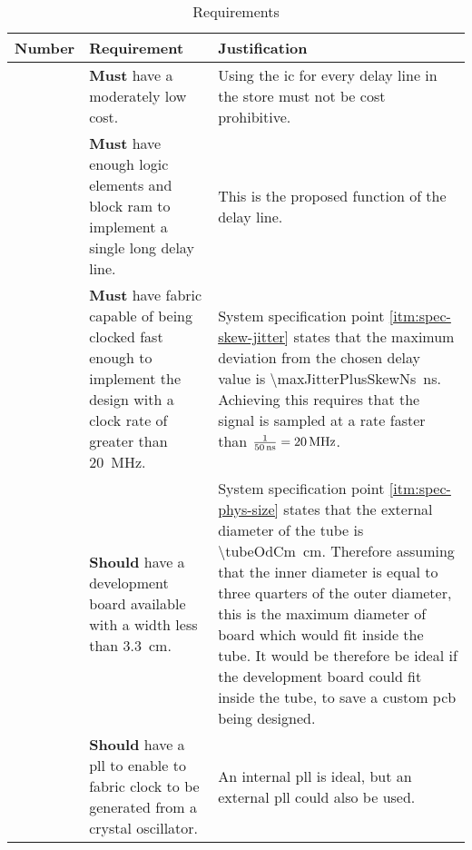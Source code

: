 \newcommand{\minFpgaClkMhz}{20}
\begin{table}[ht]
	\centering
	
	\caption{ Requirements}

	\label{tbl:fpga-reqs}
	\begin{tabular}{l p{} p{}}

		\toprule

		Number & Requirement & Justification \\

		
		\midrule

		{FpgaSpecNo}\theFpgaSpecNo\label{itm:fpga-spec-cost} &
		\textbf{Must} have a moderately low cost. &
		Using the \gls{ic} for every delay line in the store must not be cost prohibitive.\\
		
		
		\midrule
		
		{FpgaSpecNo}\theFpgaSpecNo\label{itm:fpga-spec-les} &
		\textbf{Must} have enough logic elements and block \gls{ram} to implement a single long delay line. &
		This is the proposed function of the delay line.\\
		
		\midrule

		{FpgaSpecNo}\theFpgaSpecNo\label{itm:fpga-spec-speed} &
		\textbf{Must} have fabric capable of being clocked fast enough to implement the design with a clock rate of greater than \SI{\minFpgaClkMhz}{\mega\hertz}. &
		System specification point \ref{itm:spec-skew-jitter} states that the maximum deviation from the chosen delay value is \SI{\maxJitterPlusSkewNs}{\nano\second}. Achieving this requires that the signal is sampled at a rate faster than $\frac{1}{\SI{\maxJitterPlusSkewNs}{\nano\second}}=\SI{\minFpgaClkMhz}{\mega\hertz}$.\\
		
		\midrule

		{FpgaSpecNo}\theFpgaSpecNo\label{itm:fpga-spec-dev-board} &
		\textbf{Should} have a development board available with a width less than \SI{3.3}{\centi\metre}. &
		System specification point \ref{itm:spec-phys-size} states that the external diameter of the tube is \SI{\tubeOdCm}{\centi\metre}. Therefore assuming that the inner diameter is equal to three quarters of the outer diameter, this is the maximum diameter of board which would fit inside the tube. It would be therefore be ideal if the development board could fit inside the tube, to save a custom \gls{pcb} being designed.\\

		
		\midrule

		{FpgaSpecNo}\theFpgaSpecNo\label{itm:fpga-spec-pll} &
		\textbf{Should} have a \gls{pll} to enable to fabric clock to be generated from a crystal oscillator. &
		An internal \gls{pll} is ideal, but an external \gls{pll} could also be used.\\
		
		\bottomrule

	\end{tabular}

\end{table}

